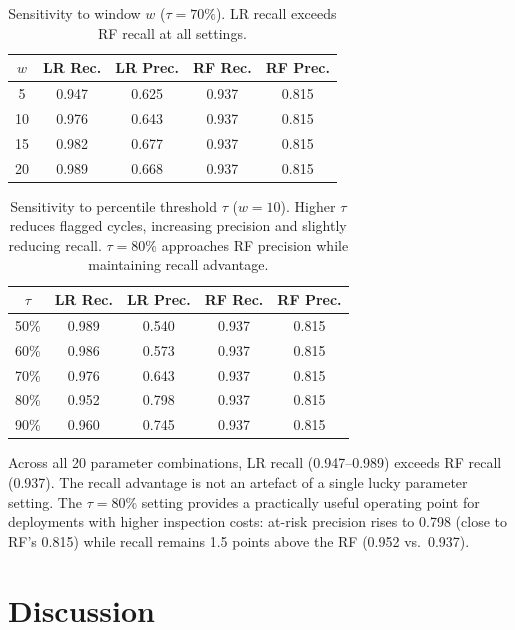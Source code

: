 \documentclass[10pt,twocolumn]{article}
\begin{document}
\begin{table}[h]
\centering
\caption{Sensitivity to window $w$ ($\tau=70\%$). LR recall exceeds RF recall at
all settings.}
\label{tab:sens_window}
\vspace{4pt}
\small
\begin{tabular}{ccccc}
\toprule
$w$ & LR Rec. & LR Prec. & RF Rec. & RF Prec. \\
\midrule
 5 & 0.947 & 0.625 & 0.937 & 0.815 \\
10 & 0.976 & 0.643 & 0.937 & 0.815 \\
15 & 0.982 & 0.677 & 0.937 & 0.815 \\
20 & 0.989 & 0.668 & 0.937 & 0.815 \\
\bottomrule
\end{tabular}
\end{table}

\begin{table}[h]
\centering
\caption{Sensitivity to percentile threshold $\tau$ ($w=10$). Higher $\tau$ reduces
flagged cycles, increasing precision and slightly reducing recall.
$\tau=80\%$ approaches RF precision while maintaining recall advantage.}
\label{tab:sens_pct}
\vspace{4pt}
\small
\begin{tabular}{ccccc}
\toprule
$\tau$ & LR Rec. & LR Prec. & RF Rec. & RF Prec. \\
\midrule
50\% & 0.989 & 0.540 & 0.937 & 0.815 \\
60\% & 0.986 & 0.573 & 0.937 & 0.815 \\
70\% & 0.976 & 0.643 & 0.937 & 0.815 \\
80\% & 0.952 & 0.798 & 0.937 & 0.815 \\
90\% & 0.960 & 0.745 & 0.937 & 0.815 \\
\bottomrule
\end{tabular}
\end{table}

Across all 20 parameter combinations, LR recall (0.947--0.989) exceeds RF recall
(0.937).
The recall advantage is not an artefact of a single lucky parameter setting.
The $\tau=80\%$ setting provides a practically useful operating point for deployments
with higher inspection costs: at-risk precision rises to 0.798 (close to RF's 0.815)
while recall remains 1.5 points above the RF (0.952 vs.\ 0.937).

\section{Discussion}
\label{sec:discussion}
\end{document}
